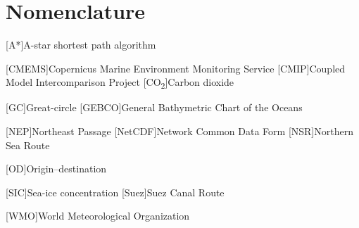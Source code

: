 \section*{Nomenclature}
\renewcommand{\baselinestretch}{0.75}\normalsize
\renewcommand{\aclabelfont}[1]{\textsc{\acsfont{#1}}}
\begin{acronym}[longest]


[A*]{A-star shortest path algorithm}

[CMEMS]{Copernicus Marine Environment Monitoring Service}
[CMIP]{Coupled Model Intercomparison Project}
[CO\textsubscript{2}]{Carbon dioxide}

[GC]{Great-circle}
[GEBCO]{General Bathymetric Chart of the Oceans}

[NEP]{Northeast Passage}
[NetCDF]{Network Common Data Form}
[NSR]{Northern Sea Route}

[OD]{Origin--destination}

[SIC]{Sea-ice concentration}
[Suez]{Suez Canal Route}

[WMO]{World Meteorological Organization}


\end{acronym}
\renewcommand{\baselinestretch}{1}\normalsize
